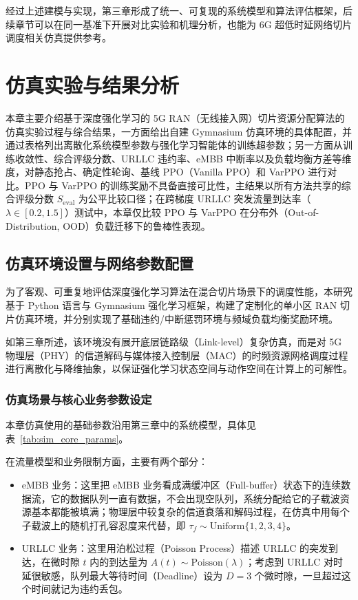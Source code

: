 经过上述建模与实现，第三章形成了统一、可复现的系统模型和算法评估框架，后续章节可以在同一基准下开展对比实验和机理分析，也能为 6G 超低时延网络切片调度相关仿真提供参考。


\chapter{仿真实验与结果分析}\label{ux56dbux4effux771fux5b9eux9a8cux4e0eux7ed3ux679cux5206ux6790}

本章主要介绍基于深度强化学习的 5G RAN（无线接入网）切片资源分配算法的仿真实验过程与综合结果，一方面给出自建 Gymnasium 仿真环境的具体配置，并通过表格列出离散化系统模型参数与强化学习智能体的训练超参数；另一方面从训练收敛性、综合评级分数、URLLC 违约率、eMBB 中断率以及负载均衡方差等维度，对静态抢占、确定性轮询、基线 PPO（Vanilla PPO）和 VarPPO 进行对比。PPO 与 VarPPO 的训练奖励不具备直接可比性，主结果以所有方法共享的综合评级分数 \(S_{\text{eval}}\) 为公平比较口径；在跨梯度 URLLC 突发流量到达率（\(\lambda \in [0.2, 1.5]\)）测试中，本章仅比较 PPO 与 VarPPO 在分布外（Out-of-Distribution, OOD）负载迁移下的鲁棒性表现。

\section{仿真环境设置与网络参数配置}\label{41-ux4effux771fux73afux5883ux8bbeux7f6eux4e0eux7f51ux7edcux53c2ux6570ux914dux7f6e}

为了客观、可重复地评估深度强化学习算法在混合切片场景下的调度性能，本研究基于 Python 语言与 Gymnasium 强化学习框架，构建了定制化的单小区 RAN 切片仿真环境，并分别实现了基础违约/中断惩罚环境与频域负载均衡奖励环境。

如第三章所述，该环境没有展开底层链路级（Link-level）复杂仿真，而是对 5G 物理层（PHY）的信道解码与媒体接入控制层（MAC）的时频资源网格调度过程进行离散化与降维抽象，以保证强化学习状态空间与动作空间在计算上的可解性。

\subsection{仿真场景与核心业务参数设定}\label{411-ux4effux771fux573aux666fux4e0eux6838ux5fc3ux4e1aux52a1ux53c2ux6570ux8bbeux5b9a}

本章仿真使用的基础参数沿用第三章中的系统模型，具体见表~\ref{tab:sim_core_params}。

在流量模型和业务限制方面，主要有两个部分：

\begin{itemize}

\item
  eMBB 业务：这里把 eMBB 业务看成满缓冲区（Full-buffer）状态下的连续数据流，它的数据队列一直有数据，不会出现空队列，系统分配给它的子载波资源基本都能被填满；物理层中较复杂的信道衰落和解码过程，在仿真中用每个子载波上的随机打孔容忍度来代替，即 \(\tau_f \sim \text{Uniform}\{1,2,3,4\}\)。
\item
  URLLC 业务：这里用泊松过程（Poisson Process）描述 URLLC 的突发到达，在微时隙 \(t\) 内的到达量为 \(A(t) \sim \text{Poisson}(\lambda)\)；考虑到 URLLC 对时延很敏感，队列最大等待时间（Deadline）设为 \(D=3\) 个微时隙，一旦超过这个时间就记为违约丢包。
\end{itemize}

